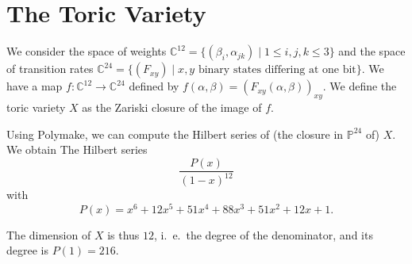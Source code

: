 \section{The Toric Variety}

We consider the space of weights $\mathbb C^{12} = \{(\beta_{i},\alpha_{jk})\mid 1\leq i,j,k\leq 3\}$ and the space of transition rates $\mathbb C^{24} = \{(F_{xy}) \mid x,y \text{ binary states differing at one bit}\}$. We have a map
$f\colon \mathbb C^{12}\to \mathbb C^{24}$ defined by $f(\alpha,\beta) = (F_{xy}(\alpha,\beta))_{xy}$. We define the toric variety $X$ as the Zariski closure of the image of $f$.

Using Polymake, we can compute the Hilbert series of (the closure in $\mathbb P^{24}$ of) $X$. We obtain The Hilbert series
	\[\frac{P(x)}{(1-x)^{12}}\]
with \[P(x)=x^6 + 12x^5 + 51x^4 + 88x^3 + 51x^2 + 12x + 1.\]

The dimension of $X$ is thus $12$, i.\ e.\ the degree of the denominator, and its degree is $P(1)=216$.